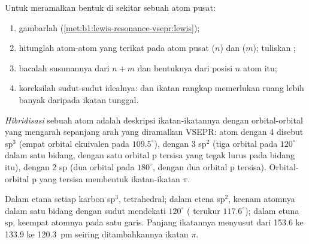 \begin{method}\label{met:b1:lewis-resonance-vsepr:vsepr}
Untuk meramalkan bentuk di sekitar sebuah atom pusat:
\begin{enumerate}
  \item gambarlah  (\cref{met:b1:lewis-resonance-vsepr:lewis});
  \item hitunglah atom-atom yang terikat pada atom pusat ($n$) dan
         ($m$); tuliskan ;
  \item bacalah susunannya dari $n + m$ dan bentuknya dari posisi
        $n$ atom itu;
  \item koreksilah sudut-sudut idealnya:  dan
        ikatan rangkap memerlukan ruang lebih banyak daripada ikatan
        tunggal.
\end{enumerate}
\end{method}

\begin{definition}[Hibridisasi]\label{def:b1:lewis-resonance-vsepr:hybridisation}
\emph{Hibridisasi} sebuah atom adalah deskripsi
ikatan-ikatannya dengan orbital-orbital yang mengarah sepanjang arah
yang diramalkan VSEPR: atom dengan  4 disebut sp$^3$
(empat orbital ekuivalen pada $109.5^\circ$), dengan  3
sp$^2$ (tiga orbital pada $120^\circ$ dalam satu bidang, dengan satu
orbital p tersisa yang tegak lurus pada bidang itu), dengan  2 sp (dua orbital pada $180^\circ$, dengan dua orbital p
tersisa). Orbital-orbital p yang tersisa membentuk ikatan-ikatan $\pi$.
\end{definition}

\begin{example}\label{ex:b1:lewis-resonance-vsepr:carbon}
Dalam etana setiap karbon sp$^3$, tetrahedral; dalam etena sp$^2$,
keenam atomnya dalam satu bidang dengan sudut mendekati $120^\circ$
( terukur $117.6^\circ$); dalam etuna sp, keempat atomnya
pada satu garis. Panjang ikatannya menyusut dari 153.6 ke 133.9 ke
\qty{120.3}{pm} seiring ditambahkannya ikatan $\pi$.
\end{example}

